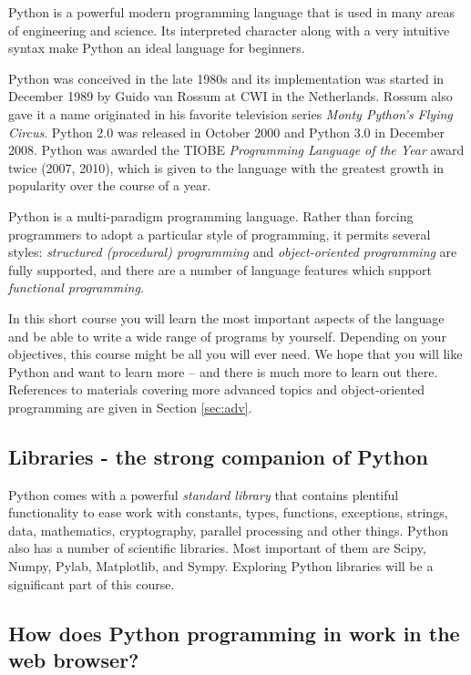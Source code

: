 Python is a powerful modern programming language that is used in many areas of 
engineering and science. Its interpreted character along with a very intuitive syntax make Python an 
ideal language for beginners. 

Python was conceived in the late 1980s and its implementation was started in December 1989
by Guido van Rossum at CWI in the Netherlands. Rossum also gave it a name originated
in his favorite television series {\em Monty Python's Flying Circus}.
Python 2.0 was released in October 2000 and Python 3.0 in December 2008. Python was
awarded the TIOBE {\em Programming Language of the Year} award twice (2007, 2010), which is 
given to the language with the greatest growth in popularity over the course of a year.

Python is a multi-paradigm programming language. Rather than forcing programmers to 
adopt a particular style of programming, it permits several styles: {\em structured (procedural) 
programming} and {\em object-oriented programming} are fully supported, and there are a number 
of language features which support {\em functional programming}. 

In this short course you will 
learn the most important aspects of the language and be able to 
write a wide range of programs by yourself. Depending on your objectives, this course 
might be all you will ever need. We hope that you will like Python and want
to learn more -- and there is much more to learn out there. References to materials
covering more advanced topics and object-oriented programming are given in Section \ref{sec:adv}.

\subsection{Libraries - the strong companion of Python}

Python comes with a powerful {\em standard library} that contains plentiful functionality
to ease work with constants, types, functions, exceptions, strings, data, 
mathematics, cryptography, parallel processing and other things. 
Python also has a number of scientific libraries. Most important of them are Scipy, 
Numpy, Pylab, Matplotlib, and Sympy. Exploring Python libraries will be a significant 
part of this course. 

\subsection{How does Python programming in work in the web browser?}

